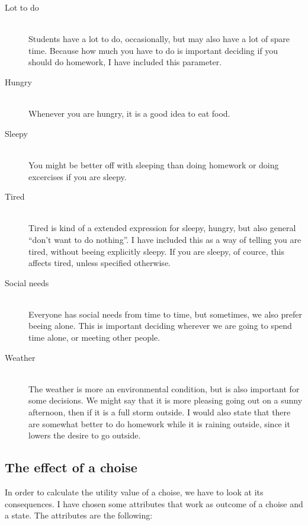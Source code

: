 \begin{description}
\item[Lot to do] \hfill \\
Students have a lot to do, occasionally, but may also have a lot of spare time.
Because how much you have to do is important deciding if you should do homework,
I have included this parameter.

\item[Hungry] \hfill \\
Whenever you are hungry, it is a good idea to eat food.

\item[Sleepy] \hfill \\
You might be better off with sleeping than doing homework or doing excercises if
you are sleepy.

\item[Tired] \hfill \\
Tired is kind of a extended expression for sleepy, hungry, but also general
``don't want to do nothing''. I have included this as a way of telling you are
tired, without beeing explicitly sleepy. If you are sleepy, of cource, this
affects tired, unless specified otherwise.

\item[Social needs] \hfill \\
Everyone has social needs from time to time, but sometimes, we also prefer
beeing alone. This is important deciding wherever we are going to spend time
alone, or meeting other people.

\item[Weather] \hfill \\
The weather is more an environmental condition, but is also important for some
decisions. We might say that it is more pleasing going out on a sunny
afternoon, then if it is a full storm outside. I would also state that there are
somewhat better to do homework while it is raining outside, since it lowers the
desire to go outside.

\end{description}

\subsection{The effect of a choise}
In order to calculate the utility value of a choise, we have to look at its
consequences. I have chosen some attributes that work as outcome of a choise and
a state. The attributes are the following:

